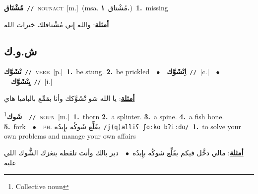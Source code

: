 \documentclass[10pt,a4paper,twoside]{article} %
\begin{document}
\begin{multicols}{2}
{\setlength\topsep{0pt}\textbf{\foreignlanguage{arabic}{مُشْتَاق}}\ {\color{gray}\texttt{//}\color{black}}\ \textsc{noun\textunderscore act}\ [m.]\ \color{gray}(msa. \foreignlanguage{arabic}{مُشْتاق}~\foreignlanguage{arabic}{\textbf{١.}})\color{black}\ \textbf{1.}~missing\  \begin{flushright}\color{gray}\foreignlanguage{arabic}{\textbf{\underline{\foreignlanguage{arabic}{أمثلة}}}: والله إِني مُشْتاقلك خيرات الله}\end{flushright}\color{black}} \vspace{2mm}

\vspace{-3mm}
\subsection*{\color{blue}\foreignlanguage{arabic}{ش.و.ك}\color{blue}{}} 

{\setlength\topsep{0pt}\textbf{\foreignlanguage{arabic}{تْشَوَّك}}\ {\color{gray}\texttt{//}\color{black}}\ \textsc{verb}\ [p.]\ \textbf{1.}~be stung.  \textbf{2.}~be prickled\ \ $\bullet$\ \ \setlength\topsep{0pt}\textbf{\foreignlanguage{arabic}{اِتْشَوَّك}}\ {\color{gray}\texttt{//}\color{black}}\ [c.]\ \ $\bullet$\ \ \setlength\topsep{0pt}\textbf{\foreignlanguage{arabic}{يِتْشَوَّك}}\ {\color{gray}\texttt{//}\color{black}}\ [i.]\  \begin{flushright}\color{gray}\foreignlanguage{arabic}{\textbf{\underline{\foreignlanguage{arabic}{أمثلة}}}: يا الله شو تْشَوَّكك وأنا بقمِّع بالباميا هاي}\end{flushright}\color{black}} \vspace{2mm}

{\setlength\topsep{0pt}\textbf{\foreignlanguage{arabic}{شَوك}}\footnote{Collective noun}\ \ {\color{gray}\texttt{//}\color{black}}\ \textsc{noun}\ [m.]\ \textbf{1.}~thorn  \textbf{2.}~a splinter.  \textbf{3.}~a spine.  \textbf{4.}~a fish bone.  \textbf{5.}~fork\ \ $\bullet$\ \ \textsc{ph.} \color{gray} \foreignlanguage{arabic}{يقَلِّع شَوكُه بإِيدُه}\color{black}\ {\color{gray}\texttt{/{\sffamily j(q)alliʕ ʃoːko bʔiːdo}/}\color{black}}\ \textbf{1.}~to solve your own problems and manage your own affairs\  \begin{flushright}\color{gray}\foreignlanguage{arabic}{\textbf{\underline{\foreignlanguage{arabic}{أمثلة}}}: مالي دخَّل فيكم يقَلِّع شوكُه بإِيدُه\ $\bullet$\ \  دير بالك وأنت تلقطه ينغزك الشُّوك اللي عليه}\end{flushright}\color{black}} \vspace{2mm}


\end{multicols}
\end{document}
